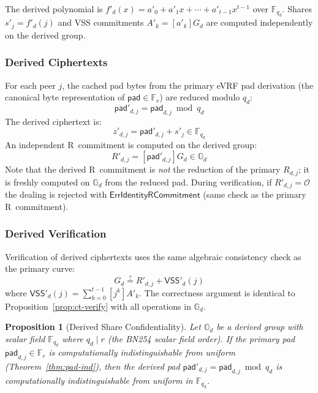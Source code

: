 \documentclass[11pt,a4paper]{article}
\newtheorem{proposition}[theorem]{Proposition}
\newcommand{\F}{\mathbb{F}}
\newcommand{\G}{\mathbb{G}}
\newcommand{\Fr}{\F_r}
\newcommand{\pad}{\mathsf{pad}}
\newcommand{\VSS}{\mathsf{VSS}}
\begin{document}
The derived polynomial is $f'_d(x) = a'_0 + a'_1 x + \cdots + a'_{t-1} x^{t-1}$
over $\F_{q_d}$. Shares $s'_j = f'_d(j)$ and VSS commitments
$A'_k = [a'_k] G_d$ are computed independently on the derived group.

\subsubsection{Derived Ciphertexts}

For each peer $j$, the cached pad bytes from the primary eVRF pad derivation
(the canonical byte representation of $\pad \in \Fr$) are reduced modulo
$q_d$:
\begin{equation}
  \pad'_{d,j} = \pad_{d,j} \bmod q_d
  \label{eq:derived-pad}
\end{equation}
The derived ciphertext is:
\begin{equation}
  z'_{d,j} = \pad'_{d,j} + s'_j \in \F_{q_d}
  \label{eq:derived-ct}
\end{equation}
An independent R~commitment is computed on the derived group:
\begin{equation}
  R'_{d,j} = [\pad'_{d,j}] G_d \in \G_d
  \label{eq:derived-rcommit}
\end{equation}
Note that the derived R~commitment is \emph{not} the reduction of the primary
$R_{d,j}$; it is freshly computed on $\G_d$ from the reduced pad. During
verification, if $R'_{d,j} = \mathcal{O}$ the dealing is rejected with
$\mathsf{ErrIdentityRCommitment}$ (same check as the primary R~commitment).

\subsubsection{Derived Verification}

Verification of derived ciphertexts uses the same algebraic consistency check
as the primary curve:
\begin{equation}
  [z'_{d,j}] G_d \stackrel{?}{=} R'_{d,j} + \VSS'_d(j)
  \label{eq:derived-verify}
\end{equation}
where $\VSS'_d(j) = \sum_{k=0}^{t-1} [j^k] A'_k$. The correctness argument
is identical to Proposition~\ref{prop:ct-verify} with all operations in $\G_d$.

\begin{proposition}[Derived Share Confidentiality]
  \label{prop:derived-conf}
  Let $\G_d$ be a derived group with scalar field $\F_{q_d}$ where $q_d \mid r$
  (the BN254 scalar field order). If the primary pad $\pad_{d,j} \in \Fr$ is
  computationally indistinguishable from uniform (Theorem~\ref{thm:pad-ind}),
  then the derived pad $\pad'_{d,j} = \pad_{d,j} \bmod q_d$ is computationally
  indistinguishable from uniform in $\F_{q_d}$.
\end{proposition}
\end{document}
